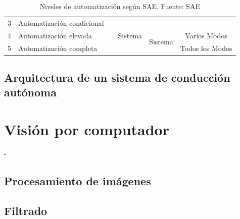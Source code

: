 \begin{table}[!h]
{\begin{tabular}{@{}|c|l|c|c|c|c|@{}}
            3                  & Automatización condicional &                                                                                          & \multirow{3}{*}{Sistema}                                                  &                                                                                          &                                                                         \\ \cmidrule(r){1-2} \cmidrule(l){5-6} 
            4                  & Automatización elevada     &                                                                                          &                                                                           & \multirow{2}{*}{Sistema}                                                                 & Varios Modos                                                            \\ \cmidrule(r){1-2} \cmidrule(l){6-6} 
            5                  & Automatización completa    &                                                                                          &                                                                           &                                                                                          & Todos los Modos                                                         \\ \bottomrule
            \end{tabular}%
            }
            \caption{Niveles de automatización según SAE. Fuente: SAE} %
            \label{tbl:niveles}
            \end{table}

    \subsection{Arquitectura de un sistema de conducción autónoma}

\section{Visión por computador}
-
    \subsection{Procesamiento de imágenes}
    \subsection{Filtrado}


